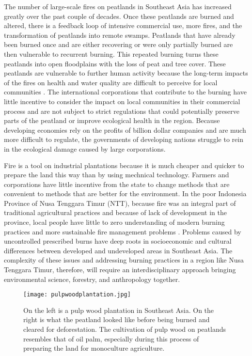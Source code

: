 The number of large-scale fires on peatlands in Southeast Asia has increased greatly over the past couple of decades. Once these peatlands are burned and altered, there is a feedback loop of intensive commercial use, more fires, and the transformation of peatlands into remote swamps. Peatlands that have already been burned once and are either recovering or were only partially burned are then vulnerable to recurrent burning. This repeated burning turns these peatlands into open floodplains with the loss of peat and tree cover. These peatlands are vulnerable to further human activity because the long-term impacts of the fires on health and water quality are difficult to perceive for local communities \citep{chokkalingam2005fire}. The international corporations that contribute to the burning have little incentive to consider the impact on local communities in their commercial process and are not subject to strict regulations that could potentially preserve parts of the peatland or improve ecological health in the region. Because developing economies rely on the profits of billion dollar companies and are much more difficult to regulate, the governments of developing nations struggle to rein in the ecological damage caused by large corporations.

Fire is a tool on industrial plantations because it is much cheaper and quicker to prepare the land this way than by using mechnical technology. Farmers and corporations have little incentive from the state to change methods that are convenient to methods that are better for the environment. In the poor Indonesia Province of Nusa Tenggara Timur (NTT), because fire was an integral part of traditional agricultural practices and because of lack of development in the province, local people have little to zero understanding of modern burning practices and more sustainable fire management problems \citep{russell2007rural}. Problems caused by uncontrolled prescribed burns have deep roots in socioeconomic and cultural differences between developed and undeveloped areas in Southeast Asia. The complexity of these issues and addressing burning practices in a region like Nusa Tenggara Timur, therefore, will require an interdisciplinary approach bringing environmental science, forestry, and anthropology together.  

\begin{figure}
  \texttt{[image: pulpwoodplantation.jpg]}
  \caption{On the left is a pulp wood plantation in Southeast Asia. On the right is what the peatland looked like before being burned and cleared for deforestation. The cultivation of pulp wood on peatlands resembles that of oil palm, especially during this process of preparing the land for monoculture agriculture.}
  \label{fig:pulpwoodplantation}
\end{figure}

